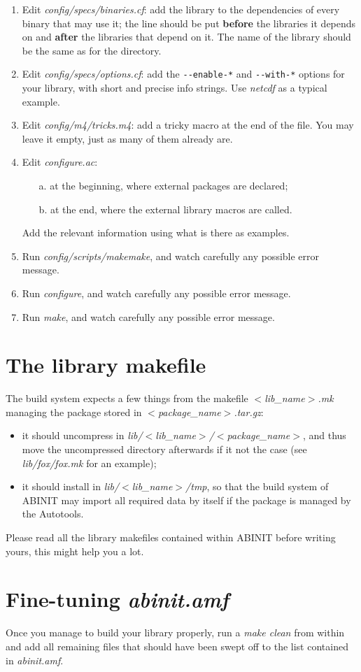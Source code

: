 \begin{enumerate}
\item Edit \textit{config/specs/binaries.cf}: add the library to the dependencies
of every binary that may use it; the line should be put \textbf{before}
the libraries it depends on and \textbf{after} the libraries that
depend on it. The name of the library should be the same as for the
directory. 
\item Edit \textit{config/specs/options.cf}: add the \texttt{-{}-enable-{*}}
and \texttt{-{}-with-{*}} options for your library, with short and
precise info strings. Use \textit{netcdf} as a typical example. 
\item Edit \textit{config/m4/tricks.m4}: add a \textquotedbl{}tricky\textquotedbl{}
macro at the end of the file. You may leave it empty, just as many
of them already are. 
\item Edit \textit{configure.ac}: 

\begin{itemize}
\item [a. ] at the beginning, where external packages are declared; 
\item [b. ] at the end, where the external library macros are called. 
\end{itemize}
Add the relevant information using what is there as examples. 

\item Run \textit{config/scripts/makemake}, and watch carefully any possible
error message. 
\item Run \textit{configure}, and watch carefully any possible error message. 
\item Run \textit{make}, and watch carefully any possible error message. 
\end{enumerate}

\section{The library makefile}

The build system expects a few things from the makefile \textit{$<$lib\_name$>$.mk}
managing the package stored in \textit{$<$package\_name$>$.tar.gz}: 
\begin{itemize}
\item it should uncompress in \textit{lib/$<$lib\_name$>$/$<$package\_name$>$},
and thus move the uncompressed directory afterwards if it not the
case (see \textit{lib/fox/fox.mk} for an example); 
\item it should install in \textit{lib/$<$lib\_name$>$/tmp}, so that the
build system of ABINIT may import all required data by itself if the
package is managed by the Autotools. 
\end{itemize}
Please read all the library makefiles contained within ABINIT before
writing yours, this might help you a lot.


\section{Fine-tuning \textit{abinit.amf}}

Once you manage to build your library properly, run a \textit{make
clean} from within and add all remaining files that should have been
swept off to the list contained in \textit{abinit.amf}.
